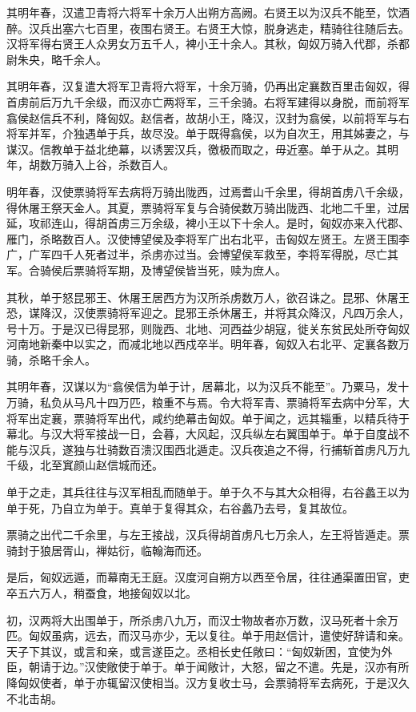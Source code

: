 \documentclass[]{article}
\begin{document}
其明年春，汉遣卫青将六将军十余万人出朔方高阙。右贤王以为汉兵不能至，饮酒醉。汉兵出塞六七百里，夜围右贤王。右贤王大惊，脱身逃走，精骑往往随后去。汉将军得右贤王人众男女万五千人，裨小王十余人。其秋，匈奴万骑入代郡，杀都尉朱央，略千余人。

其明年春，汉复遣大将军卫青将六将军，十余万骑，仍再出定襄数百里击匈奴，得首虏前后万九千余级，而汉亦亡两将军，三千余骑。右将军建得以身脱，而前将军翕侯赵信兵不利，降匈奴。赵信者，故胡小王，降汉，汉封为翕侯，以前将军与右将军并军，介独遇单于兵，故尽没。单于既得翕侯，以为自次王，用其姊妻之，与谋汉。信教单于益北绝幕，以诱罢汉兵，徼极而取之，毋近塞。单于从之。其明年，胡数万骑入上谷，杀数百人。

明年春，汉使票骑将军去病将万骑出陇西，过焉耆山千余里，得胡首虏八千余级，得休屠王祭天金人。其夏，票骑将军复与合骑侯数万骑出陇西、北地二千里，过居延，攻祁连山，得胡首虏三万余级，裨小王以下十余人。是时，匈奴亦来入代郡、雁门，杀略数百人。汉使博望侯及李将军广出右北平，击匈奴左贤王。左贤王围李广，广军四千人死者过半，杀虏亦过当。会博望侯军救至，李将军得脱，尽亡其军。合骑侯后票骑将军期，及博望侯皆当死，赎为庶人。

其秋，单于怒昆邪王、休屠王居西方为汉所杀虏数万人，欲召诛之。昆邪、休屠王恐，谋降汉，汉使票骑将军迎之。昆邪王杀休屠王，并将其众降汉，凡四万余人，号十万。于是汉已得昆邪，则陇西、北地、河西益少胡寇，徙关东贫民处所夺匈奴河南地新秦中以实之，而减北地以西戍卒半。明年春，匈奴入右北平、定襄各数万骑，杀略千余人。

其明年春，汉谋以为``翕侯信为单于计，居幕北，以为汉兵不能至''。乃粟马，发十万骑，私负从马凡十四万匹，粮重不与焉。令大将军青、票骑将军去病中分军，大将军出定襄，票骑将军出代，咸约绝幕击匈奴。单于闻之，远其辎重，以精兵待于幕北。与汉大将军接战一日，会暮，大风起，汉兵纵左右翼围单于。单于自度战不能与汉兵，遂独与壮骑数百溃汉围西北遁走。汉兵夜追之不得，行捕斩首虏凡万九千级，北至窴颜山赵信城而还。

单于之走，其兵往往与汉军相乱而随单于。单于久不与其大众相得，右谷蠡王以为单于死，乃自立为单于。真单于复得其众，右谷蠡乃去号，复其故位。

票骑之出代二千余里，与左王接战，汉兵得胡首虏凡七万余人，左王将皆遁走。票骑封于狼居胥山，禅姑衍，临翰海而还。

是后，匈奴远遁，而幕南无王庭。汉度河自朔方以西至令居，往往通渠置田官，吏卒五六万人，稍蚕食，地接匈奴以北。

初，汉两将大出围单于，所杀虏八九万，而汉士物故者亦万数，汉马死者十余万匹。匈奴虽病，远去，而汉马亦少，无以复往。单于用赵信计，遣使好辞请和亲。天子下其议，或言和亲，或言遂臣之。丞相长史任敞曰：``匈奴新困，宜使为外臣，朝请于边。''汉使敞使于单于。单于闻敞计，大怒，留之不遣。先是，汉亦有所降匈奴使者，单于亦辄留汉使相当。汉方复收士马，会票骑将军去病死，于是汉久不北击胡。
\end{document}
